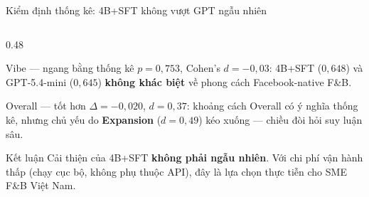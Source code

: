 \begin{frame}[t]{Kiểm định thống kê: 4B+SFT không vượt GPT ngẫu nhiên}
\begin{columns}[T,onlytextwidth]
    \begin{column}{0.48\textwidth}
      \begin{block}{Vibe --- ngang bằng thống kê}
        \scriptsize
        $p=0{,}753$, Cohen's $d=-0{,}03$: 4B+SFT ($0{,}648$) và
        GPT-5.4-mini ($0{,}645$) \textbf{không khác biệt} về phong cách
        Facebook-native F\&B.
      \end{block}

      \vspace{0.4em}
      \begin{block}{Overall --- tốt hơn}
        \scriptsize
        $\Delta=-0{,}020$, $d=0{,}37$: khoảng cách Overall có ý nghĩa
        thống kê, nhưng chủ yếu do \textbf{Expansion} ($d=0{,}49$) kéo
        xuống --- chiều đòi hỏi suy luận sâu.
      \end{block}

      \vspace{0.4em}
      \begin{block}{Kết luận}
        \scriptsize
        Cải thiện của 4B+SFT \textbf{không phải ngẫu nhiên}.
        Với chi phí vận hành thấp (chạy cục bộ, không phụ thuộc API),
        đây là lựa chọn thực tiễn cho SME F\&B Việt Nam.
      \end{block}
    \end{column}
  \end{columns}

\end{frame}
